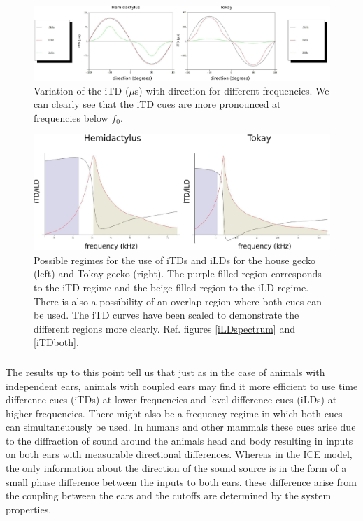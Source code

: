 \begin{figure}[ht!]
  \includegraphics[width=1.0\linewidth]{Diagrams/Plots/iTD/itddirectionboth2.png}
  \caption[Variation of the iTD with direction for different frequencies.]{Variation of the iTD ($\mu$s) with direction for different frequencies. We can clearly see that the iTD cues are more pronounced
  at frequencies below $f_0$.}
  \label{itddirectionboth}
\end{figure}

\begin{figure}[ht!]
\centering
  \includegraphics[width=1.\linewidth]{Diagrams/Plots/iTD/rangeboth.png}
  \caption[Possible frequency regimes for usage of iTD and iLD cues.]{ Possible regimes for the use of iTDs and iLDs for the house gecko (left) and Tokay gecko (right). The purple filled region corresponds to the iTD regime 
  and the beige filled region to the iLD regime. There is also a possibility of an overlap region where both cues can be used.  The iTD curves have been scaled to demonstrate the different
  regions more clearly. Ref. figures \ref{iLDspectrum} and \ref{iTDboth}.}
  \label{rangeboth}
\end{figure}

\subsubsection{}
The results up to this point tell us that just as in the case of animals with independent ears, animals
with coupled ears may find it more efficient to use time difference cues (iTDs) at lower frequencies and level difference
cues (iLDs) at higher frequencies. There might also be a frequency regime in which both cues can simultaneuously be used. In humans and
other mammals these cues arise due to the diffraction of sound around the animals head and body resulting in inputs on both ears with measurable
directional differences. Whereas in the ICE model, the only information about the direction of the sound source is in the form of a small phase
difference between the inputs to both ears. these difference arise from the coupling between the ears and the cutoffs are determined
by the system properties. 

